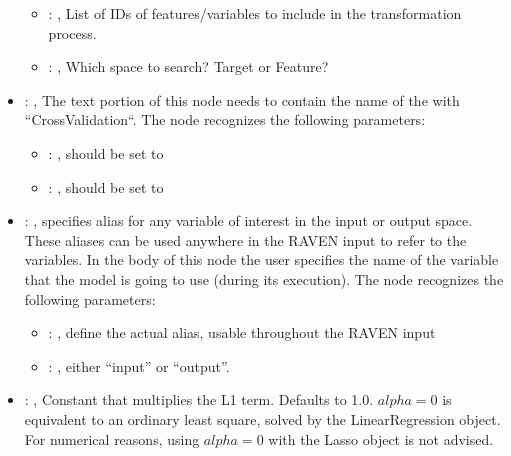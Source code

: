 \begin{itemize}
\begin{itemize}
        \item {}: , 
          List of IDs of features/variables to include in the transformation process.

        \item {}: , 
          Which space to search? Target or Feature?
      \end{itemize}

    \item {}: , 
      The text portion of this node needs to contain the name of the  with
               ``CrossValidation``.
      The  node recognizes the following parameters:
        \begin{itemize}
          \item {}: , 
            should be set to 
          \item {}: , 
            should be set to 
      \end{itemize}

    \item {}: , 
      specifies alias for         any variable of interest in the input or output space. These
      aliases can be used anywhere in the RAVEN input to         refer to the variables. In the body
      of this node the user specifies the name of the variable that the model is going to use
      (during its execution).
      The  node recognizes the following parameters:
        \begin{itemize}
          \item {}: , 
            define the actual alias, usable throughout the RAVEN input
          \item {}: , 
            either ``input'' or ``output''.
      \end{itemize}

    \item {}: , 
      Constant that multiplies the L1 term. Defaults to 1.0.
      $alpha = 0$ is equivalent to an ordinary least square, solved by
      the LinearRegression object. For numerical reasons, using $alpha = 0$
      with the Lasso object is not advised.


\end{itemize}
